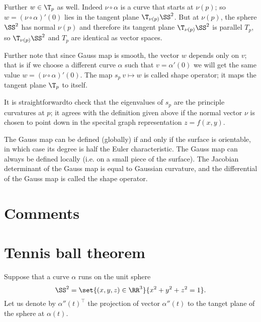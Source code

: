 Further $w\in \T_p$ as well.
Indeed $\nu\circ\alpha$ is a curve that starts at $\nu(p)$;
so $w=(\nu\circ\alpha)'(0)$ lies in the tangent plane $\T_{\nu(p)}\SS^2$.
But at $\nu(p)$, the sphere $\SS^2$ has normal $\nu(p)$ and therefore its tangent plane $\T_{\nu(p)}\SS^2$ is parallel $T_p$, so $\T_{\nu(p)}\SS^2$ and $T_p$ are identical as vector spaces.

Further note that since Gauss map is smooth,
the vector $w$ depends only on $v$;
that is if we choose a different curve $\alpha$ such that $v=\alpha'(0)$ we will get the same value $w=(\nu\circ\alpha)'(0)$.
The map $s_p\:v\mapsto w$ is called shape operator;
it maps the tangent plane $\T_p$ to itself.

It is straightforwardto check that the eigenvalues of $s_p$ are the principle curvatures at $p$; it agrees with the definition given above if the normal vector $\nu$ is chosen to point down in the specital graph representation $z=f(x,y)$.







The Gauss map can be defined (globally) if and only if the surface is orientable, in which case its degree is half the Euler characteristic. The Gauss map can always be defined locally (i.e. on a small piece of the surface). The Jacobian determinant of the Gauss map is equal to Gaussian curvature, and the differential of the Gauss map is called the shape operator. 


















\section{Comments}


\section{Tennis ball theorem}

Suppose that a curve $\alpha$ runs on the unit sphere 
\[\SS^2=\set{(x,y,z)\in\RR^3}{x^2+y^2+z^2=1}.\] 
Let us denote by $\alpha''(t)^\top$ the projection of vector $\alpha''(t)$ to the tanget plane of the sphere at $\alpha(t)$.


